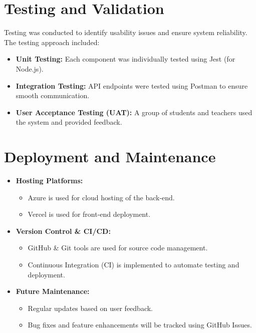 \section{Testing and Validation}
Testing was conducted to identify usability issues and ensure system reliability. The testing approach included:
\begin{itemize}
    \item \textbf{Unit Testing:} Each component was individually tested using Jest (for Node.js).
    \item \textbf{Integration Testing:} API endpoints were tested using Postman to ensure smooth communication.
    \item \textbf{User Acceptance Testing (UAT):} A group of students and teachers used the system and provided feedback.
\end{itemize}

\section{Deployment and Maintenance}
\begin{itemize}
    \item \textbf{Hosting Platforms:}
        \begin{itemize}
            \item Azure is used for cloud hosting of the back-end.
            \item Vercel is used for front-end deployment.
        \end{itemize}
    \item \textbf{Version Control \& CI/CD:}
        \begin{itemize}
            \item GitHub \& Git tools are used for source code management.
            \item Continuous Integration (CI) is implemented to automate testing and deployment.
        \end{itemize}
    \item \textbf{Future Maintenance:}
        \begin{itemize}
            \item Regular updates based on user feedback.
            \item Bug fixes and feature enhancements will be tracked using GitHub Issues.
        \end{itemize}
\end{itemize}